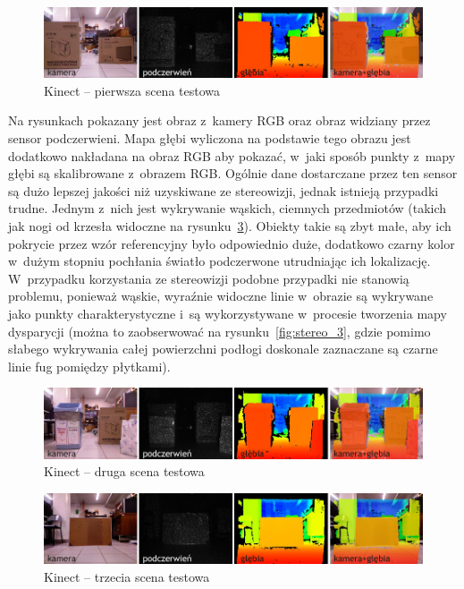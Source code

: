 \begin{figure}[h!]
\centering
\includegraphics{../../Common/img/kinect_1}
\caption[Kinect -- pierwsza scena testowa]{Kinect -- pierwsza scena testowa}
\label{fig:kinect_1}
\end{figure}

Na rysunkach pokazany jest obraz z~kamery RGB oraz obraz widziany przez sensor
podczerwieni. Mapa głębi wyliczona na podstawie tego obrazu jest dodatkowo nakładana
na obraz RGB aby pokazać, w~jaki sposób punkty z~mapy głębi są skalibrowane z~obrazem RGB.
Ogólnie dane dostarczane przez ten sensor są dużo lepszej jakości niż uzyskiwane
ze stereowizji, jednak istnieją przypadki trudne. Jednym z~nich jest wykrywanie
wąskich, ciemnych przedmiotów (takich jak nogi od krzesła widoczne na
rysunku~\ref{fig:kinect_3}). Obiekty takie są zbyt małe, aby ich pokrycie przez
wzór referencyjny było odpowiednio duże, dodatkowo czarny kolor w~dużym stopniu
pochłania światło podczerwone utrudniając ich lokalizację. W~przypadku
korzystania ze stereowizji podobne przypadki nie stanowią problemu, ponieważ
wąskie, wyraźnie widoczne linie w~obrazie są wykrywane jako punkty charakterystyczne
i~są wykorzystywane w~procesie tworzenia mapy dysparycji (można to zaobserwować
na rysunku~\ref{fig:stereo_3}, gdzie pomimo słabego wykrywania całej powierzchni
podłogi doskonale zaznaczane są czarne linie fug pomiędzy płytkami).

\begin{figure}[h!]
\centering
\includegraphics{../../Common/img/kinect_2}
\caption[Kinect -- druga scena testowa]{Kinect -- druga scena testowa}
\label{fig:kinect_2}
\end{figure}

\begin{figure}[h!]
\centering
\includegraphics{../../Common/img/kinect_3}
\caption[Kinect -- trzecia scena testowa]{Kinect -- trzecia scena testowa}
\label{fig:kinect_3}
\end{figure}

